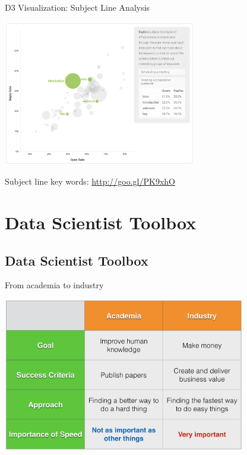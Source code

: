 \documentclass[10pt]{beamer}
\begin{document}
    \begin{frame}{D3 Visualization: Subject Line Analysis}
      \begin{center}
        \includegraphics[height=180pt]{../graphs/email_analysis_subject_line}
      \end{center}    
      {\footnotesize Subject line key words: \url{http://goo.gl/PK9xhO}}
    \end{frame}

\section{Data Scientist Toolbox}

  \subsection{Data Scientist Toolbox}
  
    \begin{frame}{From academia to industry}
      \begin{center}
        \includegraphics[width=300pt]{../graphs/academia_industry}
      \end{center}
    \end{frame}
\end{document}
